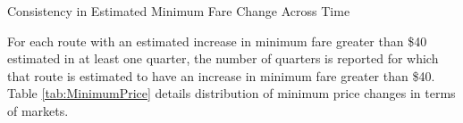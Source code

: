 \documentclass{article}
\begin{document}
\begin{appendices}
    \begin{table}
        \caption{Consistency in Estimated Minimum Fare Change Across Time}
        \label{tab:Merger_ConsistencyTable}
          \vspace{-15mm}
        \begin{center}
        
        \end{center}
        \vspace{-5mm}
        \footnotesize{For each route with an estimated increase in minimum fare greater than \$40 estimated in at least one quarter, the number of quarters is reported for which that route is estimated to have an increase in minimum fare greater than \$40. Table \ref{tab:MinimumPrice} details distribution of minimum price changes in terms of markets.}
    \end{table}
    
\end{appendices}
	
\end{document}
